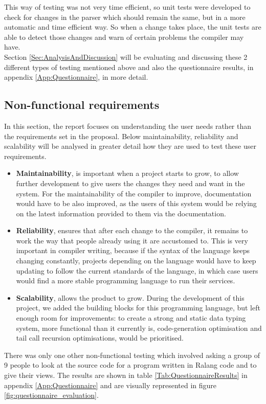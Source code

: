 \documentclass[a4paper]{article}
\begin{document}
	This way of testing was not very time efficient, so unit tests were developed to check for changes in the parser which should remain the same, but in a more automatic and time efficient way. So when a change takes place, the unit tests are able to detect those changes and warn of certain problems the compiler may have.\\
	
	Section \ref{Sec:AnalysisAndDiscussion} will be evaluating and discussing these 2 different types of testing mentioned above and also the questionnaire results, in appendix \ref{App:Questionnaire}, in more detail.
	\subsection{Non-functional requirements}
	In this section, the report focuses on understanding the user needs rather than the requirements set in the proposal. Below maintainability, reliability and scalability will be analysed in greater detail how they are used to test these user requirements.
	\begin{itemize}
		\item \textbf{Maintainability}, is important when a project starts to grow, to allow further development to give users the changes they need and want in the system. For the maintainability of the compiler to improve, documentation would have to be also improved, as the users of this system would be relying on the latest information provided to them via the documentation.
		\item \textbf{Reliability}, ensures that after each change to the compiler, it remains to work the way that people already using it are accustomed to. This is very important in compiler writing, because if the syntax of the language keeps changing constantly, projects depending on the language would have to keep updating to follow the current standards of the language, in which case users would find a more stable programming language to run their services.
		\item \textbf{Scalability}, allows the product to grow. During the development of this project, we added the building blocks for this programming language, but left enough room for improvements: to create a strong and static data typing system, more functional than it currently is, code-generation optimisation and tail call recursion optimisations, would be prioritised.
	\end{itemize}
	There was only one other non-functional testing which involved asking a group of 9 people to look at the source code for a program written in Ralang code and to give their views. The results are shown in table \ref{Tab:QuestionnaireResults} in appendix \ref{App:Questionnaire} and are visually represented in figure \ref{fig:questionnaire_evaluation}.
\end{document}
